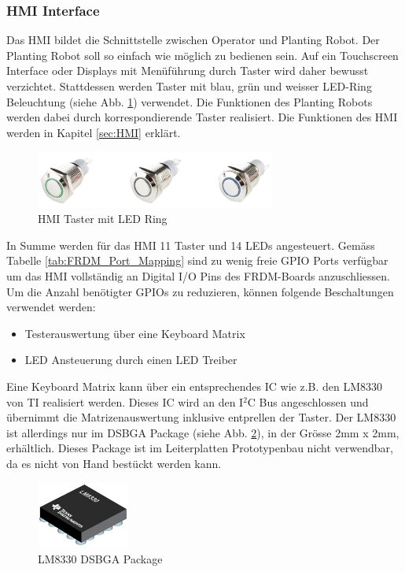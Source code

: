 \subsubsection{HMI Interface} \label{sec:Mainboard_HMI_Interface}
Das HMI bildet die Schnittstelle zwischen Operator und Planting Robot. Der Planting Robot soll so einfach wie möglich zu bedienen sein. Auf ein Touchscreen Interface oder Displays mit Menüführung durch Taster wird daher bewusst verzichtet. Stattdessen werden Taster mit blau, grün und weisser LED-Ring Beleuchtung (siehe Abb. \ref{fig:Taster_LED-Ring}) verwendet. Die Funktionen des Planting Robots werden dabei durch korrespondierende Taster realisiert. Die Funktionen des HMI werden in Kapitel \ref{sec:HMI} erklärt.
\begin{figure}[H]
	\includegraphics[width=0.7\textwidth]{Illustrationen/6-Umsetzung/HMI_LED_Taster.png}
	\caption{HMI Taster mit LED Ring \protect\cite{HMI_Taster}}
	\label{fig:Taster_LED-Ring}
\end{figure}

In Summe werden für das HMI 11 Taster und 14 LEDs angesteuert. Gemäss Tabelle \ref{tab:FRDM_Port_Mapping} sind zu wenig freie GPIO Ports verfügbar um das HMI vollständig an Digital I/O Pins des FRDM-Boards anzuschliessen. Um die Anzahl benötigter GPIOs zu reduzieren, können folgende Beschaltungen verwendet werden:
\begin{itemize}
	\item Testerauswertung über eine Keyboard Matrix
	\item LED Ansteuerung durch einen LED Treiber
\end{itemize}

Eine Keyboard Matrix kann über ein entsprechendes IC wie z.B. den LM8330 von TI realisiert werden. Dieses IC wird an den I$^2$C Bus angeschlossen und übernimmt die Matrizenauswertung inklusive entprellen der Taster. Der LM8330 ist allerdings nur im DSBGA Package (siehe Abb. \ref{fig:DSBGA_Package}), in der Grösse 2mm x 2mm, erhältlich. Dieses Package ist im Leiterplatten Prototypenbau nicht verwendbar, da es nicht von Hand bestückt werden kann.\newline

\begin{figure}[H]
	\includegraphics[width=0.27\textwidth]{Illustrationen/6-Umsetzung/DSBGA_Package.png}
	\caption{LM8330 DSBGA Package \protect\cite{DSBGA_Package}}
	\label{fig:DSBGA_Package}
\end{figure}

